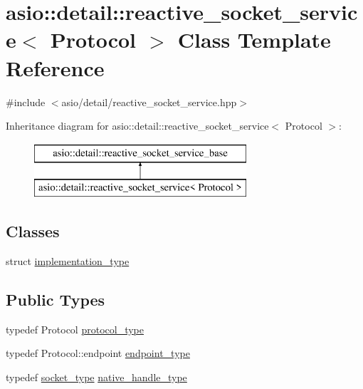 \hypertarget{classasio_1_1detail_1_1reactive__socket__service}{}\section{asio\+:\+:detail\+:\+:reactive\+\_\+socket\+\_\+service$<$ Protocol $>$ Class Template Reference}
\label{classasio_1_1detail_1_1reactive__socket__service}


{\ttfamily \#include $<$asio/detail/reactive\+\_\+socket\+\_\+service.\+hpp$>$}

Inheritance diagram for asio\+:\+:detail\+:\+:reactive\+\_\+socket\+\_\+service$<$ Protocol $>$\+:\begin{figure}[H]
\begin{center}
\leavevmode
\includegraphics[height=2.000000cm]{classasio_1_1detail_1_1reactive__socket__service}
\end{center}
\end{figure}
\subsection*{Classes}
\begin{DoxyCompactItemize}
\item 
struct \hyperlink{structasio_1_1detail_1_1reactive__socket__service_1_1implementation__type}{implementation\+\_\+type}
\end{DoxyCompactItemize}
\subsection*{Public Types}
\begin{DoxyCompactItemize}
\item 
typedef Protocol \hyperlink{classasio_1_1detail_1_1reactive__socket__service_a622bd8618dbd40771a5b6a66eb1b75e9}{protocol\+\_\+type}
\item 
typedef Protocol\+::endpoint \hyperlink{classasio_1_1detail_1_1reactive__socket__service_adad302be53c8a4ea6e7693bc88595381}{endpoint\+\_\+type}
\item 
typedef \hyperlink{namespaceasio_1_1detail_a6798c771dd84b79798b1a08150706ea9}{socket\+\_\+type} \hyperlink{classasio_1_1detail_1_1reactive__socket__service_a2fc869359f3eb7b6f25925f10e594e1d}{native\+\_\+handle\+\_\+type}
\end{DoxyCompactItemize}

